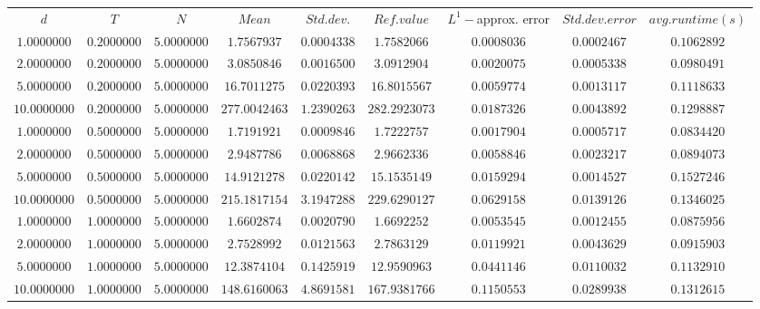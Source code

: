 \begin{tabular}{ccccccccc}
$d$ & $T$ & $N$ & $Mean$ & $Std. dev.$ & $Ref. value$ & $L^1-$approx. error & $Std. dev. error$ & $avg. runtime (s)$\\
$1.0000000$ & $0.2000000$ & $5.0000000$ & $1.7567937$ & $0.0004338$ & $1.7582066$ & $0.0008036$ & $0.0002467$ & $0.1062892$\\
$2.0000000$ & $0.2000000$ & $5.0000000$ & $3.0850846$ & $0.0016500$ & $3.0912904$ & $0.0020075$ & $0.0005338$ & $0.0980491$\\
$5.0000000$ & $0.2000000$ & $5.0000000$ & $16.7011275$ & $0.0220393$ & $16.8015567$ & $0.0059774$ & $0.0013117$ & $0.1118633$\\
$10.0000000$ & $0.2000000$ & $5.0000000$ & $277.0042463$ & $1.2390263$ & $282.2923073$ & $0.0187326$ & $0.0043892$ & $0.1298887$\\
$1.0000000$ & $0.5000000$ & $5.0000000$ & $1.7191921$ & $0.0009846$ & $1.7222757$ & $0.0017904$ & $0.0005717$ & $0.0834420$\\
$2.0000000$ & $0.5000000$ & $5.0000000$ & $2.9487786$ & $0.0068868$ & $2.9662336$ & $0.0058846$ & $0.0023217$ & $0.0894073$\\
$5.0000000$ & $0.5000000$ & $5.0000000$ & $14.9121278$ & $0.0220142$ & $15.1535149$ & $0.0159294$ & $0.0014527$ & $0.1527246$\\
$10.0000000$ & $0.5000000$ & $5.0000000$ & $215.1817154$ & $3.1947288$ & $229.6290127$ & $0.0629158$ & $0.0139126$ & $0.1346025$\\
$1.0000000$ & $1.0000000$ & $5.0000000$ & $1.6602874$ & $0.0020790$ & $1.6692252$ & $0.0053545$ & $0.0012455$ & $0.0875956$\\
$2.0000000$ & $1.0000000$ & $5.0000000$ & $2.7528992$ & $0.0121563$ & $2.7863129$ & $0.0119921$ & $0.0043629$ & $0.0915903$\\
$5.0000000$ & $1.0000000$ & $5.0000000$ & $12.3874104$ & $0.1425919$ & $12.9590963$ & $0.0441146$ & $0.0110032$ & $0.1132910$\\
$10.0000000$ & $1.0000000$ & $5.0000000$ & $148.6160063$ & $4.8691581$ & $167.9381766$ & $0.1150553$ & $0.0289938$ & $0.1312615$\\
\end{tabular}
